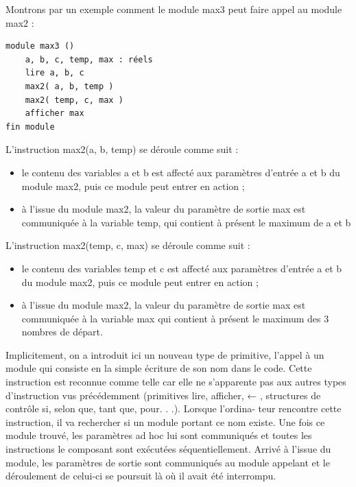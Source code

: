 \documentclass[11pt,a4paper]{article}
\begin{document}
            \par
        Montrons par un exemple comment le module max3 peut faire appel au module max2 : 
            \par
        \begin{verbatim}
module max3 ()
    a, b, c, temp, max : réels
    lire a, b, c
    max2( a, b, temp )
    max2( temp, c, max )
    afficher max
fin module
      \end{verbatim}
        L'instruction max2(a, b, temp) se d\'eroule comme suit :
        
					\begin{itemize}
				
			\item le contenu des variables a et b est affect\'e aux param\`etres d'entr\'ee a et b du module max2, puis ce module peut entrer en action ;
			\item \`a l'issue du module max2, la valeur du param\`etre de sortie max est communiqu\'ee \`a la variable temp, qui contient \`a pr\'esent le maximum de a et b
					\end{itemize}
				
            \par
        
        L'instruction max2(temp, c, max) se d\'eroule comme suit :
        
					\begin{itemize}
				
			\item le contenu des variables temp et c est affect\'e aux param\`etres d'entr\'ee a et b du module max2, puis ce module peut entrer en action ;
			\item \`a l'issue du module max2, la valeur du param\`etre de sortie max est communiqu\'ee \`a la variable max qui contient \`a pr\'esent le maximum des 3 nombres de d\'epart.
					\end{itemize}
				
            \par
        
        Implicitement, on a introduit ici un nouveau type de primitive, l'appel \`a un module qui
        consiste en la simple \'ecriture de son nom dans le code. Cette instruction est reconnue comme
        telle car elle ne s'apparente pas aux autres types d'instruction vus pr\'ec\'edemment (primitives
        lire, afficher, ← , structures de contr\^ole si, selon que, tant que, pour. . .). Lorsque l'ordina-
        teur rencontre cette instruction, il va rechercher si un module portant ce nom existe. Une
        fois ce module trouv\'e, les param\`etres ad hoc lui sont communiqu\'es et toutes les instructions
        le composant sont ex\'ecut\'ees s\'equentiellement. Arriv\'e \`a l'issue du module, les param\`etres de
        sortie sont communiqu\'es au module appelant et le d\'eroulement de celui-ci se poursuit l\`a o\`u
        il avait \'et\'e interrompu.
      
\end{document}
